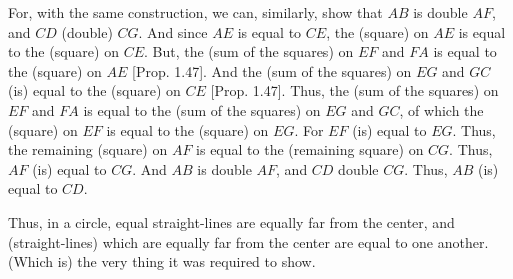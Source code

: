 \begin{Parallel}{}{}
{For, with the same construction,  we can, similarly, show that
$AB$ is double $AF$, and $CD$ (double) $CG$. And since $AE$ is equal to $CE$, the (square) on $AE$ is equal to the (square) on $CE$. But, the (sum of the squares)
on $EF$ and $FA$ is equal to the (square) on $AE$ [Prop. 1.47]. And the (sum of
the squares) on $EG$ and $GC$ (is) equal to the (square) on $CE$ [Prop. 1.47]. Thus, the (sum of the squares) on $EF$ and $FA$ is equal to the (sum of the squares) on $EG$ and $GC$, of which the (square) on $EF$ is equal to the (square)
on $EG$. For $EF$ (is) equal to $EG$. Thus, the remaining (square) on  $AF$ is equal to the (remaining square) on  $CG$. Thus, $AF$ (is) equal to $CG$. And $AB$ is double $AF$, and
$CD$ double $CG$. Thus, $AB$ (is) equal to $CD$.

Thus, in a circle, equal straight-lines are equally far from the center, and
(straight-lines) which are equally far from the center are equal to one another.
(Which is) the very thing it was required to show.}
\end{Parallel}


\vspace{7pt}{\footnotesize \noindent$^\dag$ The Greek text has ``$ABCD$'', which is obviously a
mistake.}

